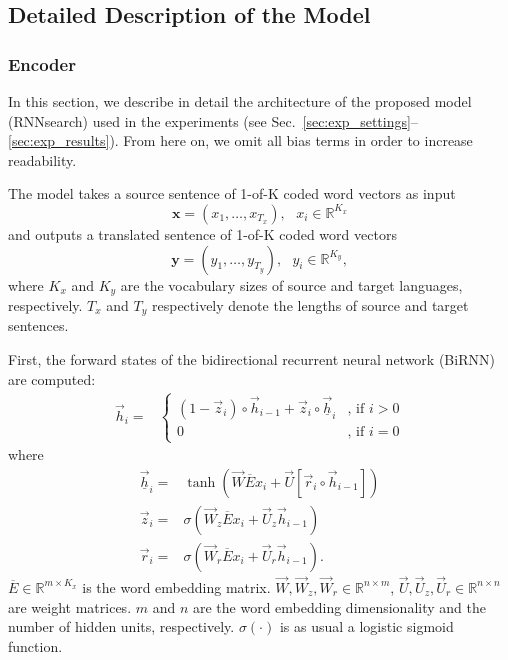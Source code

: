 \documentclass{article}
\newcommand{\vect}[1]{\mathbf{#1}}
\newcommand{\vx}[0]{\vect{x}}
\newcommand{\vy}[0]{\vect{y}}
\newcommand{\ora}{\overrightarrow}
\newcommand{\ov}{\overline}
\begin{document}
\subsection{Detailed Description of the Model}
\subsubsection{Encoder}

In this section, we describe in detail the architecture of the proposed model
(RNNsearch) used in the experiments (see
Sec.~\ref{sec:exp_settings}--\ref{sec:exp_results}).  From here on, we omit all
bias terms in order to increase readability.

The model takes a source sentence of 1-of-K coded word vectors as input
\[
    \vx = (x_1, \ldots, x_{T_x}),\mbox{ }x_i \in \mathbb{R}^{K_x}
\]
and outputs a translated sentence of 1-of-K coded word vectors
\[
    \vy = (y_1, \ldots, y_{T_y}),\mbox{ }y_i \in \mathbb{R}^{K_y},
\]
where $K_x$ and $K_y$ are the vocabulary sizes of source and target languages,
respectively. $T_x$ and $T_y$ respectively denote the lengths of source and
target sentences.

First, the forward states of the bidirectional recurrent neural network (BiRNN)
are computed:
\begin{align*}
    \ora{h}_i =& 
    \begin{cases}
        (1 - \ora{z}_i) \circ \ora{h}_{i-1}  + \ora{z}_i \circ \ora{\underline{h}}_{i} &\mbox{, if }i > 0 \\
        0 &\mbox{, if }i = 0
    \end{cases}
\end{align*}
where
\begin{align*}
    \ora{\underline{h}}_i =& \tanh \left( \ora{W} \ov{E} x_i + \ora{U}\left[ \ora{r}_i \circ \ora{h}_{i-1} \right] \right) \\
    \ora{z}_i =& \sigma\left( \ora{W}_z \ov{E} x_i + \ora{U}_z \ora{h}_{i-1} \right) \\
    \ora{r}_i =& \sigma\left( \ora{W}_r \ov{E} x_i + \ora{U}_r \ora{h}_{i-1} \right).
\end{align*}
$\overline{E} \in \mathbb{R}^{m\times K_x}$ is the word embedding matrix.
$\ora{W}, \ora{W}_z, \ora{W}_r \in \mathbb{R}^{n\times m}$, $\ora{U}, \ora{U}_z,
\ora{U}_r \in \mathbb{R}^{n\times n}$ are weight matrices. $m$ and $n$ are the word
embedding dimensionality and the number of hidden units, respectively. 
$\sigma(\cdot)$ is as usual a logistic sigmoid function.
\end{document}

